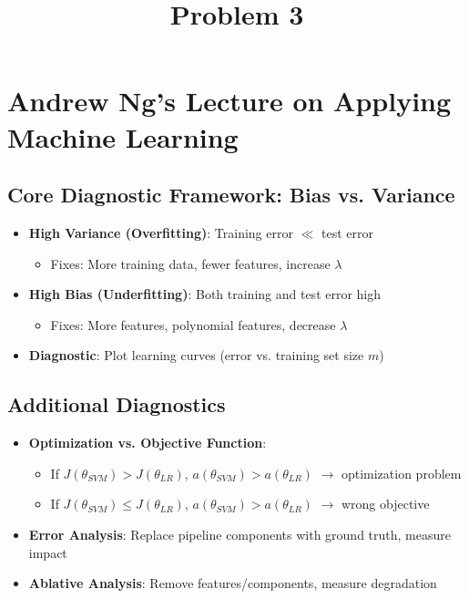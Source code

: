\documentclass[12pt]{article}
\title{Problem 3}
\author{}
\date{}
\begin{document}
\thispagestyle{empty}

\section*{Andrew Ng's Lecture on Applying Machine Learning}

\subsection*{Core Diagnostic Framework: Bias vs. Variance}

\begin{itemize}
\item \textbf{High Variance (Overfitting)}: Training error $\ll$ test error
   \begin{itemize}
   \item Fixes: More training data, fewer features, increase $\lambda$
   \end{itemize}
\item \textbf{High Bias (Underfitting)}: Both training and test error high
   \begin{itemize}
   \item Fixes: More features, polynomial features, decrease $\lambda$
   \end{itemize}
\item \textbf{Diagnostic}: Plot learning curves (error vs. training set size $m$)
\end{itemize}

\subsection*{Additional Diagnostics}

\begin{itemize}
\item \textbf{Optimization vs. Objective Function}:
   \begin{itemize}
   \item If $J(\theta_{SVM}) > J(\theta_{LR})$, $a(\theta_{SVM}) > a(\theta_{LR})$ $\rightarrow$ optimization problem
   \item If $J(\theta_{SVM}) \leq J(\theta_{LR})$, $a(\theta_{SVM}) > a(\theta_{LR})$ $\rightarrow$ wrong objective
   \end{itemize}
\item \textbf{Error Analysis}: Replace pipeline components with ground truth, measure impact
\item \textbf{Ablative Analysis}: Remove features/components, measure degradation
\end{itemize}
\end{document}
